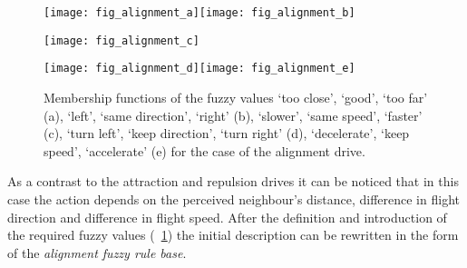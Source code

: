 \begin{figure}
  \null\vspace*{2mm}\par
  \texttt{[image: fig\_alignment\_a]}\hspace*{2mm}\texttt{[image: fig\_alignment\_b]}
  \par\vspace*{2mm}
  \texttt{[image: fig\_alignment\_c]}
  \par\vspace*{2mm}
  \texttt{[image: fig\_alignment\_d]}\hspace*{2mm}\texttt{[image: fig\_alignment\_e]}
  \par\vspace*{2mm}
  \caption{Membership functions of the fuzzy values `too close', `good', `too far' (a), `left', `same direction', `right' (b), `slower', `same speed', `faster' (c), `turn left', `keep direction', `turn right' (d), `decelerate', `keep speed', `accelerate' (e) for the case of the alignment drive.}
  \label{fig:fuzzyAnimat:Dp:afd}
\end{figure}

As a contrast to the attraction and repulsion drives it can be noticed that in this case the action depends on the perceived neighbour's distance, difference in flight direction and difference in flight speed. After the definition and introduction of the required fuzzy values (\fig~\ref{fig:fuzzyAnimat:Dp:afd}) the initial description can be rewritten in the form of the \emph{alignment fuzzy rule base}.

